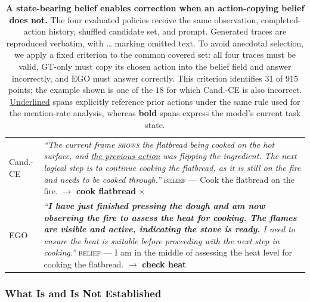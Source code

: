 \documentclass[letterpaper]{article}
\newcommand{\obs}[1]{\textcolor{measuredblue}{#1}}
\newcommand{\method}{\textsc{EGO}}
\newcommand{\cmark}{\checkmark}
\begin{document}
\begin{table}[t]
\begin{tabular}{@{}p{}p{}@{}}
Cand.-CE
  & \emph{``The current frame \textsc{shows} the flatbread being cooked on the
    hot surface, and \underline{the previous action} was flipping the
    ingredient. The next logical step is to continue cooking the flatbread, as
    it is still on the fire and needs to be cooked through.''}
    \newline
    \textsc{belief} --- Cook the flatbread on the fire.
    \newline
    $\rightarrow$ \textbf{cook flatbread} $\times$
    \quad{\scriptsize[scene description via ``shows'']} \\
\method{}
  & \emph{``\textbf{I have just finished pressing the dough and am now
    observing the fire to assess the heat for cooking. The flames are visible
    and active, indicating the stove is ready.} I need to ensure the heat is
    suitable before proceeding with the next step in cooking.''}
    \newline
    \textsc{belief} --- I am in the middle of assessing the heat level for
    cooking the flatbread.
    \newline
    $\rightarrow$ \textbf{check heat} \cmark
    \quad{\scriptsize[state-bearing belief; no explicit prior-action reference]} \\
\bottomrule
\end{tabular}
\caption{\textbf{A state-bearing belief enables correction when an
action-copying belief does not.}  The four evaluated policies receive the
same observation, completed-action history, shuffled candidate set, and
prompt.  Generated traces are reproduced verbatim, with \ldots{} marking
omitted text.  To avoid anecdotal selection, we apply a fixed criterion to the
common covered set: all four traces must be valid, GT-only must copy its chosen
action into the belief field and answer incorrectly, and \method{} must answer
correctly.  This criterion identifies \obs{$31$} of \obs{$915$} points; the
example shown is one of the \obs{$18$} for which Cand.-CE is also incorrect.
\underline{Underlined} spans explicitly reference prior actions under the
same rule used for the mention-rate analysis, whereas \textbf{bold} spans
express the model's current task state.}
\label{tab:trace-echo}
\end{table}

\subsubsection{What Is and Is Not Established}
\label{sec:er-scope}
\end{document}
